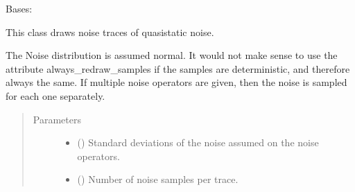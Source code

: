 \documentclass[letterpaper,10pt,english]{sphinxmanual}
\begin{document}
\begin{fulllineitems}
\label{\detokenize{qsim:qsim.noise.NTGQuasiStatic}}
Bases: {\hyperref[\detokenize{qsim:qsim.noise.NoiseTraceGenerator}]{}}

This class draws noise traces of quasistatic noise.

The Noise distribution is assumed normal. It would not make sense to use
the attribute always\_redraw\_samples if the samples are deterministic,
and therefore always the same. If multiple noise operators are given, then
the noise is sampled for each one separately.
\begin{quote}\begin{description}
\item[{Parameters}] \leavevmode\begin{itemize}
\item {} 
 (\sphinxstyleliteralemphasis{\sphinxupquote{{[}}}\sphinxstyleliteralemphasis{\sphinxupquote{{]}}}\sphinxstyleliteralemphasis{\sphinxupquote{, }}\sphinxstyleliteralemphasis{\sphinxupquote{ (}}\sphinxstyleliteralemphasis{\sphinxupquote{)}}) \textendash{} Standard deviations of the noise assumed on the noise operators.

\item {} 
 () \textendash{} Number of noise samples per trace.


\end{itemize}
\end{description}
\end{quote}
\end{fulllineitems}
\end{document}
